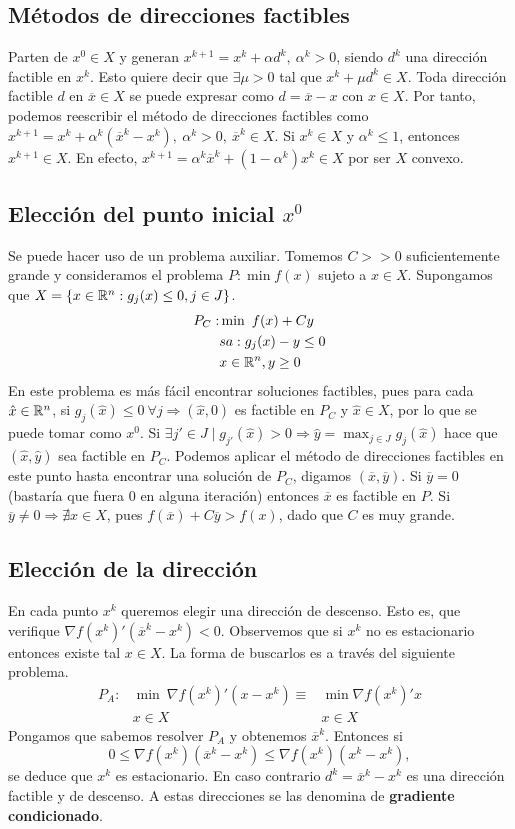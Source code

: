 \documentclass[MIOP.tex]{subfiles}
\begin{document}
\subsection{Métodos de direcciones factibles}

Parten de $x^0\in X$ y generan $x^{k+1}=x^k+\alpha d^k,\ \alpha^k>0$, siendo $d^k$ una dirección factible en $x^k$. Esto quiere decir que $\exists\mu >0$ tal que $x^{k}+\mu d^k\in X$. Toda dirección factible $d$ en $\overline{x}\in X$ se puede expresar como $d=\overline{x}-x$ con $x\in X$. Por tanto, podemos reescribir el método de direcciones factibles como $x^{k+1}=x^k+\alpha^k(\overline{x}^k-x^k),\ \alpha^k>0,\ \overline{x}^k\in X$. Si $x^k\in X$ y $\alpha^k\leq 1$, entonces $x^{k+1}\in X$. En efecto, $x^{k+1}=\alpha^k\overline{x}^k+(1-\alpha^k)x^k\in X$ por ser $X$ convexo. 

\subsection{Elección del punto inicial $x^0$}
Se puede hacer uso de un problema auxiliar. Tomemos $C>>0$ suficientemente grande y consideramos el problema $P:\min f(x)$ sujeto a $x\in X$. Supongamos que $X=\{x\in\mathbb{R}^n: g_j(x)\leq 0, j\in J\}$. 
\begin{align*}
P_C:&\min\ f(x)+Cy\\
 & sa:g_j(x)-y\leq 0\\
 & x\in\mathbb{R}^n, y\geq 0
\end{align*}
En este problema es más fácil encontrar soluciones factibles, pues para cada $\hat{x}\in\mathbb{R}^n$, si $g_j(\hat{x})\leq 0\ \forall j\Rightarrow (\hat{x},0)$ es factible en $P_C$ y $\hat{x}\in X$, por lo que se puede tomar como $x^0$. Si $\exists j'\in J \mid g_{j'}(\hat{x})>0\Rightarrow \hat{y}=\max_{j\in J} g_j(\hat{x})$ hace que $(\hat{x},\hat{y})$ sea factible en $P_C$. Podemos aplicar el método de direcciones factibles en este punto hasta encontrar una solución de $P_C$, digamos $(\overline{x},\overline{y})$. Si $\overline{y}=0$ (bastaría que fuera 0 en alguna iteración) entonces $\overline{x}$ es factible en $P$. Si $\overline{y}\neq 0\Rightarrow\nexists x\in X$, pues $f(\overline{x})+C\overline{y}>f(x)$, dado que $C$ es muy grande.

\subsection{Elección de la dirección}
En cada punto $x^k$ queremos elegir una dirección de descenso. Esto es, que verifique $\nabla f(x^k)'(\overline{x}^k-x^k)<0$. Observemos que si $x^k$ no es estacionario entonces existe tal $x\in X$. La forma de buscarlos es a través del siguiente problema. 
\begin{align*}
P_A: &\min\ \nabla f(x^k)'(x-x^k) \equiv & \min \nabla f(x^k)'x\\
 & x\in X								& x\in X
\end{align*}
Pongamos que sabemos resolver $P_A$ y obtenemos $\overline{x}^k$. Entonces si $$0\leq\nabla f(x^k)(\overline{x}^k-x^k)\leq \nabla  f(x^k)(x^k-x^k),$$ se deduce que $x^k$ es estacionario. En caso contrario $d^k=\overline{x}^k-x^k$ es una dirección factible y de descenso. A estas direcciones se las denomina de \textbf{gradiente condicionado}.
\end{document}
